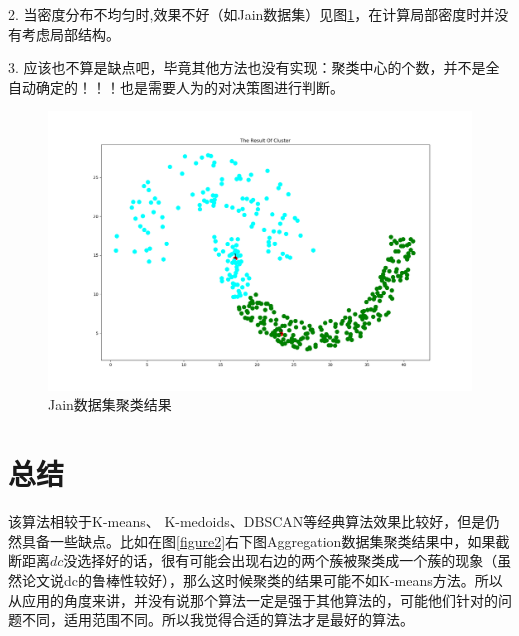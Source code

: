 2. 当密度分布不均匀时,效果不好（如Jain数据集）见图\ref{figure2_5}，在计算局部密度时并没有考虑局部结构。

3. 应该也不算是缺点吧，毕竟其他方法也没有实现：聚类中心的个数，并不是全自动确定的！！！也是需要人为的对决策图进行判断。
\begin{figure}[ht]
\centering
\includegraphics[scale=0.45]{figure/2_5.png}%
\caption{Jain数据集聚类结果}
\label{figure2_5}
\end{figure}

\section{总结}

该算法相较于K-means、 K-medoids、DBSCAN等经典算法效果比较好，但是仍然具备一些缺点。比如在图\ref{figure2}右下图Aggregation数据集聚类结果中，如果截断距离$dc$没选择好的话，很有可能会出现右边的两个蔟被聚类成一个蔟的现象（虽然论文说dc的鲁棒性较好），那么这时候聚类的结果可能不如K-means方法。所以从应用的角度来讲，并没有说那个算法一定是强于其他算法的，可能他们针对的问题不同，适用范围不同。所以我觉得合适的算法才是最好的算法。





































